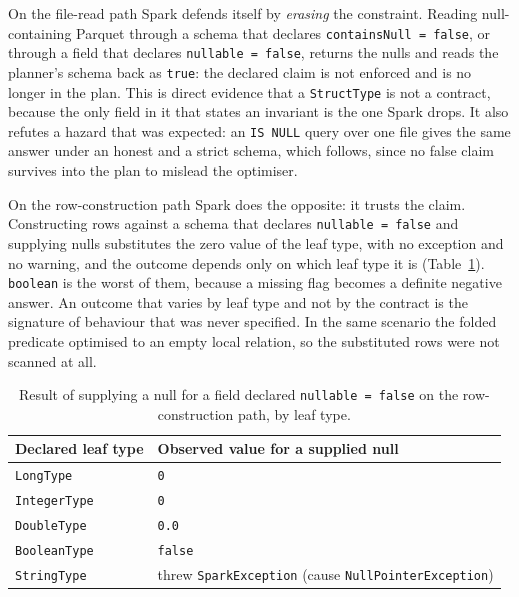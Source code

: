 On the file-read path Spark defends itself by \emph{erasing} the constraint. Reading null-containing Parquet through a schema that declares \texttt{containsNull = false}, or through a field that declares \texttt{nullable = false}, returns the nulls and reads the planner's schema back as \texttt{true}: the declared claim is not enforced and is no longer in the plan. This is direct evidence that a \texttt{StructType} is not a contract, because the only field in it that states an invariant is the one Spark drops. It also refutes a hazard that was expected: an \texttt{IS NULL} query over one file gives the same answer under an honest and a strict schema, which follows, since no false claim survives into the plan to mislead the optimiser.

On the row-construction path Spark does the opposite: it trusts the claim. Constructing rows against a schema that declares \texttt{nullable = false} and supplying nulls substitutes the zero value of the leaf type, with no exception and no warning, and the outcome depends only on which leaf type it is (Table~\ref{tab:leaves}). \texttt{boolean} is the worst of them, because a missing flag becomes a definite negative answer. An outcome that varies by leaf type and not by the contract is the signature of behaviour that was never specified. In the same scenario the folded predicate optimised to an empty local relation, so the substituted rows were not scanned at all.

\begin{table}[t]
  \caption{Result of supplying a null for a field declared \texttt{nullable = false} on the row-construction path, by leaf type.}
  \label{tab:leaves}
  \centering
  \scriptsize
  \begin{tabular}{ll}
    \toprule
    Declared leaf type & Observed value for a supplied null \\
    \midrule
    \texttt{LongType} & \texttt{0} \\
    \texttt{IntegerType} & \texttt{0} \\
    \texttt{DoubleType} & \texttt{0.0} \\
    \texttt{BooleanType} & \texttt{false} \\
    \texttt{StringType} & threw \texttt{SparkException} (cause \texttt{NullPointerException}) \\
    \bottomrule
  \end{tabular}
\end{table}

